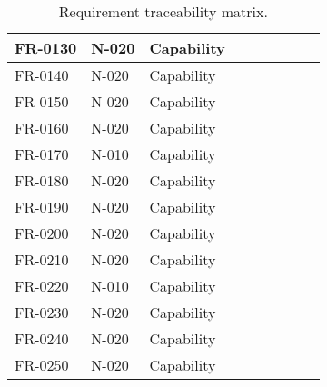\begin{sidewaystable}
\begin{table}[H]
\begin{tabular}{|p{2cm}|p{2cm}|p{3cm}|p{2cm}|p{2cm}|p{2cm}|p{2cm}|p{2cm}|p{2cm}|}
 FR-0130 & N-020 & Capability & & & & & &\\ \hline
 FR-0140 & N-020 & Capability & & & & & &\\ \hline
 FR-0150 & N-020 & Capability & & & & & &\\ \hline
 FR-0160 & N-020 & Capability & & & & & &\\ \hline
 FR-0170 & N-010 & Capability & & & & & &\\ \hline
 FR-0180 & N-020 & Capability & & & & & &\\ \hline
 FR-0190 & N-020 & Capability & & & & & &\\ \hline
 FR-0200 & N-020 & Capability & & & & & &\\ \hline
 FR-0210 & N-020 & Capability & & & & & &\\ \hline
 FR-0220 & N-010 & Capability & & & & & &\\ \hline
 FR-0230 & N-020 & Capability & & & & & &\\ \hline
 FR-0240 & N-020 & Capability & & & & & &\\ \hline
 FR-0250 & N-020 & Capability & & & & & &\\ \hline
 
\end{tabular}	
\caption{Requirement traceability matrix.}
\end{table}

\end{sidewaystable}



